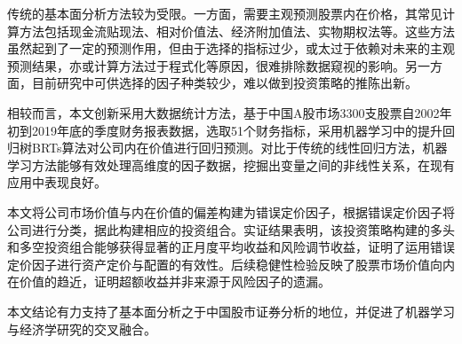 
传统的基本面分析方法较为受限。一方面，需要主观预测股票内在价格，其常见计算方法包括现金流贴现法、相对价值法、经济附加值法、实物期权法等。这些方法虽然起到了一定的预测作用，但由于选择的指标过少，或太过于依赖对未来的主观预测结果，亦或计算方法过于程式化等原因，很难排除数据窥视的影响。另一方面，目前研究中可供选择的因子种类较少，难以做到投资策略的推陈出新。

相较而言，本文创新采用大数据统计方法，基于中国A股市场3300支股票自2002年初到2019年底的季度财务报表数据，选取51个财务指标，采用机器学习中的提升回归树BRTs算法对公司内在价值进行回归预测。对比于传统的线性回归方法，机器学习方法能够有效处理高维度的因子数据，挖掘出变量之间的非线性关系，在现有应用中表现良好。

本文将公司市场价值与内在价值的偏差构建为错误定价因子，根据错误定价因子将公司进行分类，据此构建相应的投资组合。实证结果表明，该投资策略构建的多头和多空投资组合能够获得显著的正月度平均收益和风险调节收益，证明了运用错误定价因子进行资产定价与配置的有效性。后续稳健性检验反映了股票市场价值向内在价值的趋近，证明超额收益并非来源于风险因子的遗漏。

本文结论有力支持了基本面分析之于中国股市证券分析的地位，并促进了机器学习与经济学研究的交叉融合。
